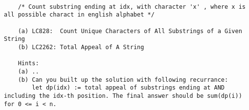 
\begin{verbatim}

    /* Count substring ending at idx, with character 'x' , where x is all possible charact in english alphabet */

    (a) LC828:  Count Unique Characters of All Substrings of a Given String
    (b) LC2262: Total Appeal of A String

    Hints:
    (a) .. 
    (b) Can you built up the solution with following recurrance:
        let dp(idx) := total appeal of substrings ending at AND including the idx-th position. The final answer should be sum(dp(i)) for 0 <= i < n.
\end{verbatim}

